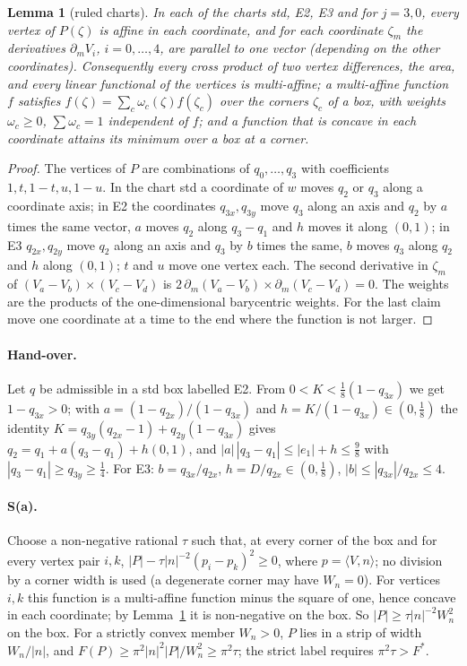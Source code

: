 \documentclass[11pt]{article}
\newtheorem{lemma}[theorem]{Lemma}
\theoremstyle{remark}
\begin{document}
\begin{lemma}[ruled charts]\label{lem:ruled}
In each of the charts std, E2, E3 and for $j=3,0$, every vertex of $P(\zeta)$ is affine in each coordinate, and for
each coordinate $\zeta_m$ the derivatives $\partial_mV_i$, $i=0,\dots,4$, are parallel to one vector (depending on the
other coordinates). Consequently every cross product of two vertex differences, the area, and every linear
functional of the vertices is multi-affine; a multi-affine function $f$ satisfies $f(\zeta)=\sum_c\omega_c(\zeta)f(\zeta_c)$
over the corners $\zeta_c$ of a box, with weights $\omega_c\ge0$, $\sum\omega_c=1$ independent of $f$; and a function that is
concave in each coordinate attains its minimum over a box at a corner.
\end{lemma}
\begin{proof}
The vertices of $P$ are combinations of $q_0,\dots,q_3$ with coefficients $1,t,1-t,u,1-u$. In the chart std a
coordinate of $w$ moves $q_2$ or $q_3$ along a coordinate axis; in E2 the coordinates $q_{3x},q_{3y}$ move $q_3$ along an
axis and $q_2$ by $a$ times the same vector, $a$ moves $q_2$ along $q_3-q_1$ and $h$ moves it along $(0,1)$; in E3
$q_{2x},q_{2y}$ move $q_2$ along an axis and $q_3$ by $b$ times the same, $b$ moves $q_3$ along $q_2$ and $h$ along
$(0,1)$; $t$ and $u$ move one vertex each. The second derivative in $\zeta_m$ of $(V_a-V_b)\times(V_c-V_d)$ is
$2\,\partial_m(V_a-V_b)\times\partial_m(V_c-V_d)=0$. The weights are the products of the one-dimensional barycentric
weights. For the last claim move one coordinate at a time to the end where the function is not larger.
\end{proof}

\paragraph{Hand-over.} Let $q$ be admissible in a std box labelled E2. From $0<K<\frac18(1-q_{3x})$ we get $1-q_{3x}>0$;
with $a=(1-q_{2x})/(1-q_{3x})$ and $h=K/(1-q_{3x})\in(0,\frac18)$ the identity $K=q_{3y}(q_{2x}-1)+q_{2y}(1-q_{3x})$ gives
$q_2=q_1+a(q_3-q_1)+h(0,1)$, and $|a|\,|q_3-q_1|\le|e_1|+h\le\frac98$ with $|q_3-q_1|\ge q_{3y}\ge\frac14$. For E3:
$b=q_{3x}/q_{2x}$, $h=D/q_{2x}\in(0,\frac18)$, $|b|\le|q_{3x}|/q_{2x}\le4$.

\paragraph{S(a).} Choose a non-negative rational $\tau$ such that, at every corner of the box and for every vertex
pair $i,k$, $|P|-\tau|n|^{-2}(p_i-p_k)^2\ge0$, where $p=\langle V,n\rangle$; no division by a corner width is used (a
degenerate corner may have $W_n=0$). For vertices $i,k$ this function is a multi-affine function minus the square of
one, hence concave in each coordinate; by Lemma~\ref{lem:ruled} it is non-negative on the box. So
$|P|\ge\tau|n|^{-2}W_n^2$ on the box. For a strictly convex member $W_n>0$, $P$ lies in a strip of width $W_n/|n|$, and
$F(P)\ge\pi^2|n|^2|P|/W_n^2\ge\pi^2\tau$; the strict label requires $\pi^2\tau>F^*$.
\end{document}
